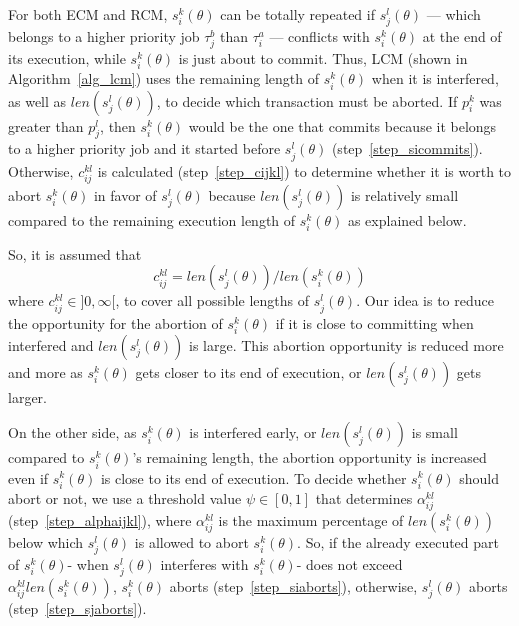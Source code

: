 \documentclass[conference]{IEEEtran}
\begin{document}
For both ECM and RCM, $s_{i}^{k}(\theta)$ can be totally repeated if $s_{j}^{l}(\theta)$ --- which belongs to a higher priority job $\tau_{j}^b$ than $\tau_{i}^a$ --- conflicts with $s_{i}^{k}(\theta)$
at the end of its execution, while $s_{i}^{k}(\theta)$ is just about
to commit. Thus, LCM (shown in Algorithm~\ref{alg_lcm}) uses the remaining length of $s_{i}^{k}(\theta)$ when it is interfered,
as well as $len(s_{j}^{l}(\theta))$, to decide which transaction must be aborted. If $p_i^k$ was greater than $p_j^l$, then $s_i^k(\theta)$ would be the one that commits because it belongs to a higher priority job and it started before $s_j^l(\theta)$ (step~\ref{step_sicommits}). Otherwise, $c_{ij}^{kl}$ is calculated (step~\ref{step_cijkl}) to determine whether it is worth to abort $s_i^k(\theta)$ in favor of $s_j^l(\theta)$ because $len(s_j^l(\theta))$ is relatively small compared to the remaining execution length of $s_i^k(\theta)$ as explained below.

So, it is assumed that 
\begin{equation}
c_{ij}^{kl}=len(s_{j}^{l}(\theta))/len(s_{i}^{k}(\theta))
\label{cm_eq}\end{equation}
where $c_{ij}^{kl}\in]0,\infty[$, to cover all possible lengths of $s_{j}^{l}(\theta)$.
Our idea is to reduce the opportunity for the abortion of $s_{i}^{k}(\theta)$ if it is close to committing when interfered and $len(s_{j}^{l}(\theta))$ is large. This abortion opportunity is reduced more and more as $s_{i}^{k}(\theta)$ gets closer to its end of execution, or $len(s_{j}^{l}(\theta))$ gets larger. 

On the other side, as $s_{i}^{k}(\theta)$ is interfered early,
or $len(s_{j}^{l}(\theta))$ is small compared to $s_{i}^{k}(\theta)$'s remaining length, the abortion opportunity 
is increased even if $s_i^k (\theta)$ is close to its end of execution. To decide whether $s_{i}^{k}(\theta)$ should abort or not, we use a threshold value $\psi\in[0,1]$ that determines $\alpha_{ij}^{kl}$ (step~\ref{step_alphaijkl}), where $\alpha_{ij}^{kl}$ is the maximum percentage of $len(s_i^k(\theta))$ below which $s_j^l(\theta)$ is allowed to abort $s_i^k(\theta)$. So, if the already executed part of $s_i^k(\theta)$- when $s_j^l(\theta)$ interferes with $s_i^k(\theta)$- does not exceed $\alpha_{ij}^{kl}len(s_i^k(\theta))$, $s_i^k(\theta)$ aborts (step~\ref{step_siaborts}), otherwise, $s_j^l(\theta)$ aborts (step~\ref{step_sjaborts}).
\end{document}
